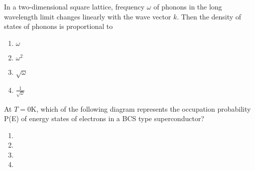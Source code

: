     \item In a two-dimensional square lattice, frequency $\omega$ of phonons in the long wavelength limit changes linearly with the wave vector $k$. Then the density of states of phonons is proportional to
    \begin{enumerate}
        \item $\omega$
        \item $\omega^2$
        \item $\sqrt{\omega}$
        \item $\frac{1}{\sqrt{\omega}}$
    \end{enumerate}
    
   \item At $T=0$K, which of the following diagram represents the occupation probability P(E) of energy states of electrons in a BCS type superconductor?
   \begin{enumerate}
   \item 
 
   
  
   \item 

   
   
   \item 
   
   
   
   \item 
   
   
   
   \end{enumerate}
   
